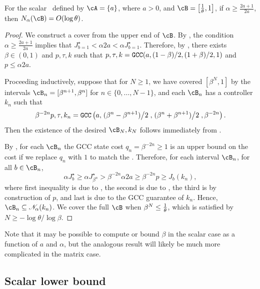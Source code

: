 \begin{theorem}
\label{thm:covering-scalar}
	For the scalar \DDFproblem\ defined by
		$\cA = \{ a \}$,
		where $a > 0$,
		and 
		$\cB = \left[\textstyle \recip \breadth, 1 \right]$,
	if $\alpha \geq \frac{2a+1}{2a}$,
	then $\coveringnum{\alpha}{\cB} = O(\log \breadth)$.
\end{theorem}
\begin{proof}
	We construct a cover from the upper end of $\cB$.
	By ,
	the condition ${\alpha \geq \frac{2a+1}{2a}}$ implies that
	\(
		J^\star_{b=1} < \alpha 2 a < \alpha J^\star_{b=1}.
	\)
	Therefore, by
	,
	there exists $\beta \in (0, 1)$
	and
	$p, \tau, k$
	such that
	$p, \tau, k = {\normalfont \texttt{GCC}}(a, (1-\beta)/2, (1+\beta)/2, 1)$
	and
	$p \leq \alpha 2a$.

	Proceeding inductively,
	suppose that for $N \geq 1$,
	we have covered $[\beta^N, 1]$
	by the intervals $\cB_n = [\beta^{n+1}, \beta^{n}]$
	for $n \in \{0, \dots, N-1\}$,
	and each $\cB_n$ has a controller $k_n$ such that 
	\[
		\beta^{-2n}p, \tau, k_n = {\normalfont \texttt{GCC}} \left(
			a,
			\left. (\beta^{n} - \beta^{n+1}) \middle/ 2 \right.,
			\left. (\beta^{n} + \beta^{n+1}) \middle/ 2 \right.,
			\beta^{-2n}
		\right).
	\]
	Then the existence of the desired $\cB_N, k_N$
	follows immediately from
	.

	By ,
	for each $\cB_n$
	the GCC state cost $q_n = \beta^{-2n} \geq 1$
	is an upper bound on the cost if we replace $q_n$ with $1$
	to match the \DDFproblem.
	Therefore,
	for each interval $\cB_n$,
	for all $b \in \cB_n$,
	\[
		\alpha J^\star_{b}
		\geq
		\alpha J^\star_{\beta^n}
		>
		\beta^{-2n} \alpha 2 a 
		\geq
		\beta^{-2n} p
		\geq
		J_b(k_n),
	\]
	where first inequality is due to ,
	the second is due to ,
	the third is by construction of $p$,
	and last is due to the GCC guarantee of $k_n$.
	Hence, $\cB_n \subseteq \suboptneighb{\alpha}{k_n}$.
	We cover the full $\cB$ when
	$\beta^{N} \leq \frac{1}{\theta}$,
	which is satisfied by $N \geq - \log \theta / \log \beta$.
\end{proof} 
Note that it may be possible to compute or bound $\beta$ in the scalar case
as a function of $a$ and $\alpha$,
but the analogous result will likely be much more complicated in the matrix case.

\subsection{Scalar lower bound}

